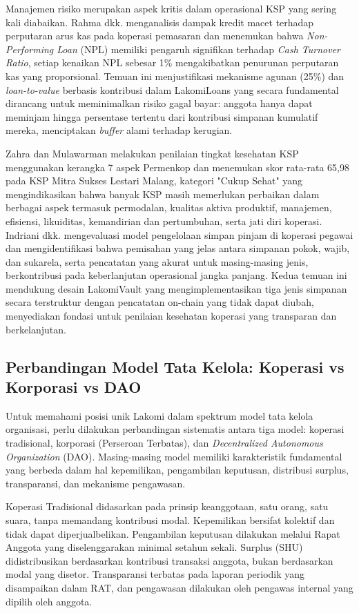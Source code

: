 Manajemen risiko merupakan aspek kritis dalam operasional KSP yang sering kali diabaikan. Rahma dkk. \cite{rahma2026analisis} menganalisis dampak kredit macet terhadap perputaran arus kas pada koperasi pemasaran dan menemukan bahwa \textit{Non-Performing Loan} (NPL) memiliki pengaruh signifikan terhadap \textit{Cash Turnover Ratio}, setiap kenaikan NPL sebesar 1\% mengakibatkan penurunan perputaran kas yang proporsional. Temuan ini menjustifikasi mekanisme agunan (25\%) dan \textit{loan-to-value} berbasis kontribusi dalam LakomiLoans yang secara fundamental dirancang untuk meminimalkan risiko gagal bayar: anggota hanya dapat meminjam hingga persentase tertentu dari kontribusi simpanan kumulatif mereka, menciptakan \textit{buffer} alami terhadap kerugian.

Zahra dan Mulawarman \cite{zahra2021penilaian} melakukan penilaian tingkat kesehatan KSP menggunakan kerangka 7 aspek Permenkop dan menemukan skor rata-rata 65,98 pada KSP Mitra Sukses Lestari Malang, kategori "Cukup Sehat" yang mengindikasikan bahwa banyak KSP masih memerlukan perbaikan dalam berbagai aspek termasuk permodalan, kualitas aktiva produktif, manajemen, efisiensi, likuiditas, kemandirian dan pertumbuhan, serta jati diri koperasi. Indriani dkk. \cite{indriani2025model} mengevaluasi model pengelolaan simpan pinjam di koperasi pegawai dan mengidentifikasi bahwa pemisahan yang jelas antara simpanan pokok, wajib, dan sukarela, serta pencatatan yang akurat untuk masing-masing jenis, berkontribusi pada keberlanjutan operasional jangka panjang. Kedua temuan ini mendukung desain LakomiVault yang mengimplementasikan tiga jenis simpanan secara terstruktur dengan pencatatan on-chain yang tidak dapat diubah, menyediakan fondasi untuk penilaian kesehatan koperasi yang transparan dan berkelanjutan.

\subsection{Perbandingan Model Tata Kelola: Koperasi vs Korporasi vs DAO}

Untuk memahami posisi unik Lakomi dalam spektrum model tata kelola organisasi, perlu dilakukan perbandingan sistematis antara tiga model: koperasi tradisional, korporasi (Perseroan Terbatas), dan \textit{Decentralized Autonomous Organization} (DAO). Masing-masing model memiliki karakteristik fundamental yang berbeda dalam hal kepemilikan, pengambilan keputusan, distribusi surplus, transparansi, dan mekanisme pengawasan.

Koperasi Tradisional didasarkan pada prinsip keanggotaan, satu orang, satu suara, tanpa memandang kontribusi modal. Kepemilikan bersifat kolektif dan tidak dapat diperjualbelikan. Pengambilan keputusan dilakukan melalui Rapat Anggota yang diselenggarakan minimal setahun sekali. Surplus (SHU) didistribusikan berdasarkan kontribusi transaksi anggota, bukan berdasarkan modal yang disetor. Transparansi terbatas pada laporan periodik yang disampaikan dalam RAT, dan pengawasan dilakukan oleh pengawas internal yang dipilih oleh anggota.

